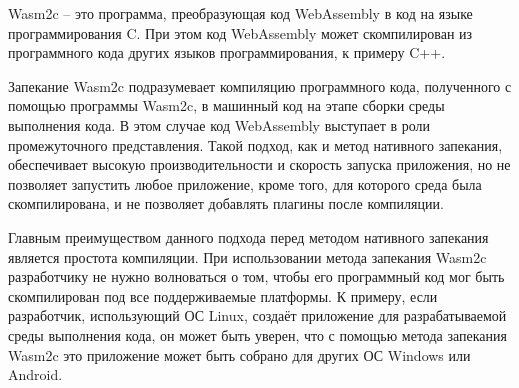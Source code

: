 Wasm2c -- это программа, преобразующая код WebAssembly в код на языке программирования C.
При этом код WebAssembly может скомпилирован из программного кода других языков программирования, к примеру C++.

Запекание Wasm2c подразумевает компиляцию программного кода, полученного с помощью программы Wasm2c, в машинный код на этапе сборки среды выполнения кода.
В этом случае код WebAssembly выступает в роли промежуточного представления.
Такой подход, как и метод нативного запекания, обеспечивает высокую производительности и скорость запуска приложения, но не позволяет запустить любое приложение, кроме того, для которого среда была скомпилирована, и не позволяет добавлять плагины после компиляции.

Главным преимуществом данного подхода перед методом нативного запекания является простота компиляции.
При использовании метода запекания Wasm2c разработчику не нужно волноваться о том, чтобы его программный код мог быть скомпилирован под все поддерживаемые платформы.
К примеру, если разработчик, использующий ОС Linux, создаёт приложение для разрабатываемой среды выполнения кода, он может быть уверен, что с помощью метода запекания Wasm2c это приложение может быть собрано для других ОС Windows или Android.
